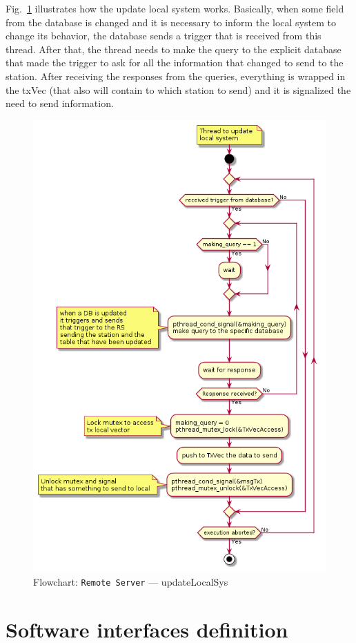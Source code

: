 Fig.~\ref{fig:flow-rs-update-local-sys} illustrates how the update local system works.
Basically, when some field from the database is changed and it is necessary to inform the local system to change its behavior, the database sends a trigger that is received from this thread. After that, the thread needs to make the query to the explicit database that made the trigger to ask for all the information that changed to send to the station.
After receiving the responses from the queries, everything is wrapped in the txVec (that also will contain to which station to send) and it is signalized the need to send information.
%
\begin{figure}[htb!]
\centering
    \includegraphics[width=0.6\columnwidth]{./img/flow-rs-updt-local-sys.png}
  \caption{Flowchart: \texttt{Remote Server} --- updateLocalSys}%
\label{fig:flow-rs-update-local-sys}
\end{figure}


\section{Software interfaces definition}
\label{sec:sw-interf-def}
%
% 

